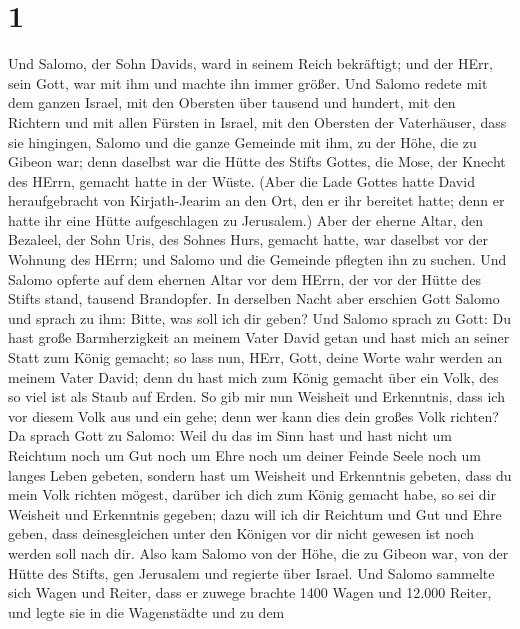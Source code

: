 \hypertarget{section}{%
\section{1}\label{section}}

 Und Salomo, der Sohn Davids, ward in seinem Reich
bekräftigt; und der HErr, sein Gott, war mit ihm und machte ihn immer
größer.  Und Salomo redete mit dem ganzen Israel, mit den
Obersten über tausend und hundert, mit den Richtern und mit allen
Fürsten in Israel, mit den Obersten der Vaterhäuser,  dass
sie hingingen, Salomo und die ganze Gemeinde mit ihm, zu der Höhe, die
zu Gibeon war; denn daselbst war die Hütte des Stifts Gottes, die Mose,
der Knecht des HErrn, gemacht hatte in der Wüste.  (Aber die
Lade Gottes hatte David heraufgebracht von Kirjath-Jearim an den Ort,
den er ihr bereitet hatte; denn er hatte ihr eine Hütte aufgeschlagen zu
Jerusalem.)  Aber der eherne Altar, den Bezaleel, der Sohn
Uris, des Sohnes Hurs, gemacht hatte, war daselbst vor der Wohnung des
HErrn; und Salomo und die Gemeinde pflegten ihn zu suchen. 
Und Salomo opferte auf dem ehernen Altar vor dem HErrn, der vor der
Hütte des Stifts stand, tausend Brandopfer.  In derselben
Nacht aber erschien Gott Salomo und sprach zu ihm: Bitte, was soll ich
dir geben?  Und Salomo sprach zu Gott: Du hast große
Barmherzigkeit an meinem Vater David getan und hast mich an seiner Statt
zum König gemacht;  so lass nun, HErr, Gott, deine Worte
wahr werden an meinem Vater David; denn du hast mich zum König gemacht
über ein Volk, des so viel ist als Staub auf Erden.  So gib
mir nun Weisheit und Erkenntnis, dass ich vor diesem Volk aus und ein
gehe; denn wer kann dies dein großes Volk richten?  Da
sprach Gott zu Salomo: Weil du das im Sinn hast und hast nicht um
Reichtum noch um Gut noch um Ehre noch um deiner Feinde Seele noch um
langes Leben gebeten, sondern hast um Weisheit und Erkenntnis gebeten,
dass du mein Volk richten mögest, darüber ich dich zum König gemacht
habe,  so sei dir Weisheit und Erkenntnis gegeben; dazu
will ich dir Reichtum und Gut und Ehre geben, dass deinesgleichen unter
den Königen vor dir nicht gewesen ist noch werden soll nach dir.
 Also kam Salomo von der Höhe, die zu Gibeon war, von der
Hütte des Stifts, gen Jerusalem und regierte über Israel. 
Und Salomo sammelte sich Wagen und Reiter, dass er zuwege brachte 1400
Wagen und 12.000 Reiter, und legte sie in die Wagenstädte und zu dem
